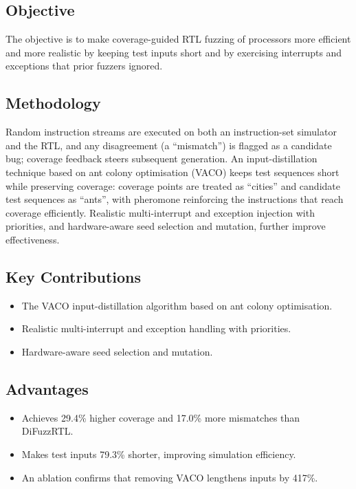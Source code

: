 \documentclass[12pt,a4paper]{report}
\begin{document}
\subsection{Objective}
The objective is to make coverage-guided RTL fuzzing of processors more efficient and more
realistic by keeping test inputs short and by exercising interrupts and exceptions that
prior fuzzers ignored.

\subsection{Methodology}
Random instruction streams are executed on both an instruction-set simulator and the RTL,
and any disagreement (a ``mismatch'') is flagged as a candidate bug; coverage feedback
steers subsequent generation. An input-distillation technique based on ant colony
optimisation (VACO) keeps test sequences short while preserving coverage: coverage points
are treated as ``cities'' and candidate test sequences as ``ants'', with pheromone
reinforcing the instructions that reach coverage efficiently. Realistic multi-interrupt and
exception injection with priorities, and hardware-aware seed selection and mutation, further
improve effectiveness.

\subsection{Key Contributions}
\begin{itemize}[nosep]
  \item The VACO input-distillation algorithm based on ant colony optimisation.
  \item Realistic multi-interrupt and exception handling with priorities.
  \item Hardware-aware seed selection and mutation.
\end{itemize}

\subsection{Advantages}
\begin{itemize}[nosep]
  \item Achieves 29.4\% higher coverage and 17.0\% more mismatches than DiFuzzRTL.
  \item Makes test inputs 79.3\% shorter, improving simulation efficiency.
  \item An ablation confirms that removing VACO lengthens inputs by 417\%.
\end{itemize}
\end{document}
